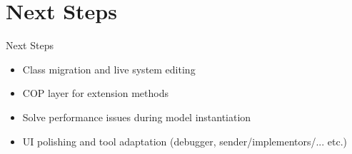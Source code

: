 \documentclass[xcolor=dvipsname, handout]{beamer} %
\begin{document}
\section{Next Steps}
\begin{frame}{Next Steps}
  \begin{itemize}
    \item Class migration and live system editing
    \item COP layer for extension methods
    \item Solve performance issues during model instantiation
    \item UI polishing and tool adaptation (debugger, sender/implementors/... etc.)
  \end{itemize}
\end{frame}
\end{document}
